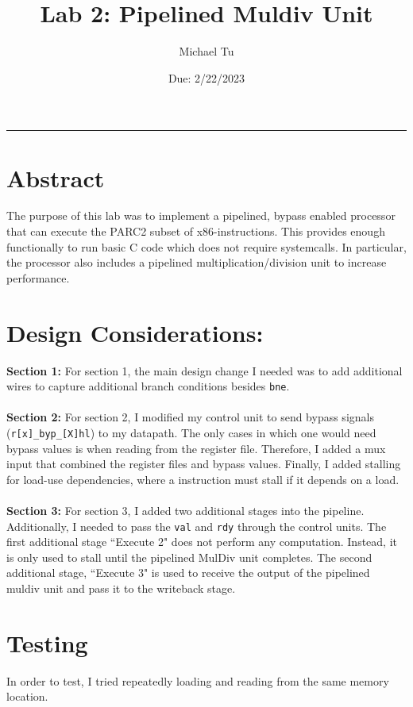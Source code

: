 \documentclass[a4paper, 12pt]{article}
\begin{document}
\title{\vspace*{-.9in}Lab 2: Pipelined Muldiv Unit}
\date{Due: 2/22/2023}
\author{Michael Tu}
\maketitle
\hrule

\section{Abstract}
The purpose of this lab was to implement a pipelined, bypass enabled processor that can execute the PARC2 subset of x86-instructions. This provides enough functionally to run basic C code which does not require systemcalls. In particular, the processor also includes a pipelined multiplication/division unit to increase performance.

\section{Design Considerations:}
\textbf{Section 1:} For section 1, the main design change I needed was to add additional wires to capture additional branch conditions besides \texttt{bne}.
\\ \\
\textbf{Section 2:} For section 2, I modified my control unit to send bypass signals (\texttt{r[x]\_byp\_[X]hl}) to my datapath. The only cases in which one would need bypass values is when reading from the register file. Therefore, I added a mux input that combined the register files and bypass values. Finally, I added stalling for load-use dependencies, where a instruction must stall if it depends on a load.
\\ \\
\textbf{Section 3:} For section 3, I added two additional stages into the pipeline. Additionally, I needed to pass the \texttt{val} and \texttt{rdy} through the control units. The first additional stage ``Execute 2" does not perform any computation. Instead, it is only used to stall until the pipelined MulDiv unit completes. The second additional stage, ``Execute 3" is used to receive the output of the pipelined muldiv unit and pass it to the writeback stage.

\section{Testing}
In order to test, I tried repeatedly loading and reading from the same memory location. 
\end{document}
